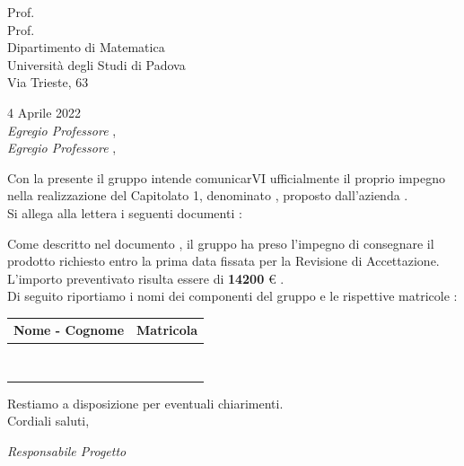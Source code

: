 	\begin{flushright}
		Prof. \Tullio					\\
		Prof. \Ric 						\\
		Dipartimento di Matematica  	\\
		Università degli Studi di Padova\\
		Via Trieste, 63					
	\end{flushright}
	
	\begin{flushleft}
		4 Aprile 2022					\\
		\textit{Egregio Professore \Tullio}, \\
		\textit{Egregio Professore \Ric}, 
	\end{flushleft}
		Con la presente il gruppo \textit{\docNomeTeam} intende comunicarVI ufficialmente il proprio impegno nella realizzazione del Capitolato 1, denominato \textit{\prog}, proposto dall'azienda \textit{\azienda}.\\
		Si allega alla lettera i seguenti documenti :
	
		\documenti
		
		Come descritto nel documento \can, il gruppo \textit{\docNomeTeam} ha preso l'impegno di consegnare il prodotto richiesto entro la prima data fissata per la Revisione di Accettazione.
		L'importo preventivato risulta essere di \textbf{14200 }€ .
		\\
		\newpage
		Di seguito riportiamo i nomi dei componenti del gruppo e le rispettive matricole :
		\begin{table}[htb]
			\centering
				\begin{tabular} { c c }
					Nome - Cognome & Matricola 		\\
					\hline \hline					\\
					\Ire 	& \MIre					\\
					\Tom 	& \MTom					\\
					\MatE 	& \MMatE				\\
					\Pie 	& \MPie					\\
					\Andre	& \MAndre				\\
					\MatP 	& \MMatP				\\
					\Sam 	& \MSam					\\
				\end{tabular}
		\end{table}
	 
		\begin{flushleft}										
			Restiamo a disposizione per eventuali chiarimenti.		\\
			Cordiali saluti,
		\end{flushleft} 
	
		\begin{flushright}
			\textit{Responsabile Progetto} \\
		\end{flushright}
	\thispagestyle{empty}   